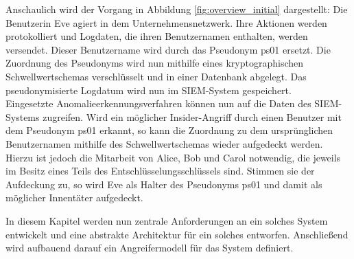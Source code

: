Anschaulich wird der Vorgang in Abbildung \ref{fig:overview_initial} dargestellt: Die Benutzerin Eve agiert in dem Unternehmensnetzwerk. Ihre Aktionen werden protokolliert und Logdaten, die ihren Benutzernamen enthalten, werden versendet. Dieser Benutzername wird durch das Pseudonym ps01 ersetzt. Die Zuordnung des Pseudonyms wird nun mithilfe eines kryptographischen Schwellwertschemas verschlüsselt und in einer Datenbank abgelegt. Das pseudonymisierte Logdatum wird nun im SIEM-System gespeichert.\\
Eingesetzte Anomalieerkennungsverfahren können nun auf die Daten des SIEM-Systems zugreifen. Wird ein möglicher Insider-Angriff durch einen Benutzer mit dem Pseudonym ps01 erkannt, so kann die Zuordnung zu dem ursprünglichen Benutzernamen mithilfe des Schwellwertschemas wieder aufgedeckt werden. Hierzu ist jedoch die Mitarbeit von Alice, Bob und Carol notwendig, die jeweils im Besitz eines Teils des Entschlüsselungsschlüssels sind. Stimmen sie der Aufdeckung zu, so wird Eve als Halter des Pseudonyms ps01 und damit als möglicher Innentäter aufgedeckt.

In diesem Kapitel werden nun zentrale Anforderungen an ein solches System entwickelt und eine abstrakte Architektur für ein solches entworfen. Anschließend wird aufbauend darauf ein Angreifermodell für das System definiert.





